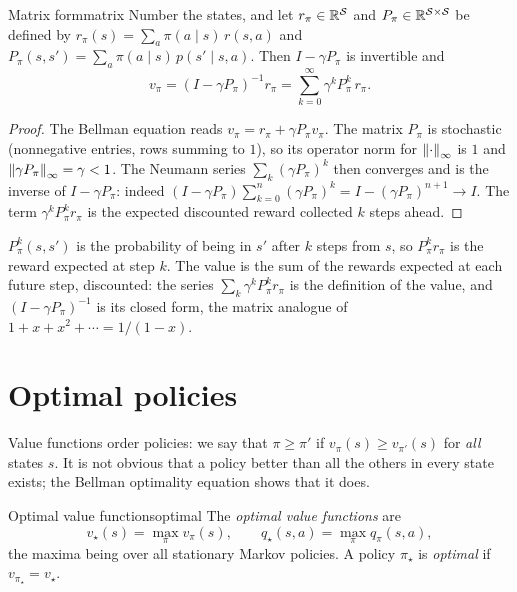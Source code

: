 \begin{proposition}{Matrix form}{matrix}
  Number the states, and let $r_\pi \in \mathbb{R}^{\mathcal{S}}$ and $P_\pi \in
  \mathbb{R}^{\mathcal{S} \times \mathcal{S}}$ be defined by $r_\pi(s) = \sum_a \pi(a \mid
  s)\, r(s, a)$ and $P_\pi(s, s') = \sum_a \pi(a \mid s)\, p(s' \mid s, a)$.
  Then $I - \gamma P_\pi$ is invertible and
  \begin{equation}
    v_\pi = (I - \gamma P_\pi)^{-1} r_\pi
    = \sum_{k=0}^{\infty} \gamma^k P_\pi^k\, r_\pi.
  \end{equation}
\end{proposition}

\begin{proof}
  The Bellman equation reads $v_\pi = r_\pi + \gamma P_\pi v_\pi$. The
  matrix $P_\pi$ is stochastic (nonnegative entries, rows summing to $1$),
  so its operator norm for $\left\lVert \cdot \right\rVert_\infty$ is $1$ and $\left\lVert \gamma
  P_\pi \right\rVert_\infty = \gamma < 1$. The Neumann series $\sum_k (\gamma P_\pi)^k$
  then converges and is the inverse of $I - \gamma P_\pi$: indeed
  $(I - \gamma P_\pi) \sum_{k=0}^{n} (\gamma P_\pi)^k = I - (\gamma
  P_\pi)^{n+1} \to I$. The term $\gamma^k P_\pi^k r_\pi$ is the expected
  discounted reward collected $k$ steps ahead.
\end{proof}

\begin{intuition}
  $P_\pi^k(s, s')$ is the probability of being in $s'$ after $k$ steps from
  $s$, so $P_\pi^k r_\pi$ is the reward expected at step $k$. The value is
  the sum of the rewards expected at each future step, discounted: the
  series $\sum_k \gamma^k P_\pi^k r_\pi$ is the definition of the value,
  and $(I - \gamma P_\pi)^{-1}$ is its closed form, the matrix analogue of
  $1 + x + x^2 + \cdots = 1/(1 - x)$.
\end{intuition}

\section{Optimal policies}

Value functions order policies: we say that $\pi \geq \pi'$ if $v_\pi(s)
\geq v_{\pi'}(s)$ for \emph{all} states $s$. It is not obvious that a policy
better than all the others in every state exists; the Bellman optimality
equation shows that it does.

\begin{definition}{Optimal value functions}{optimal}
  The \emph{optimal value functions} are
  \begin{equation}
    v_\star(s) = \max_\pi v_\pi(s), \qquad
    q_\star(s, a) = \max_\pi q_\pi(s, a),
  \end{equation}
  the maxima being over all stationary Markov policies. A policy $\pi_\star$
  is \emph{optimal} if $v_{\pi_\star} = v_\star$.
\end{definition}

